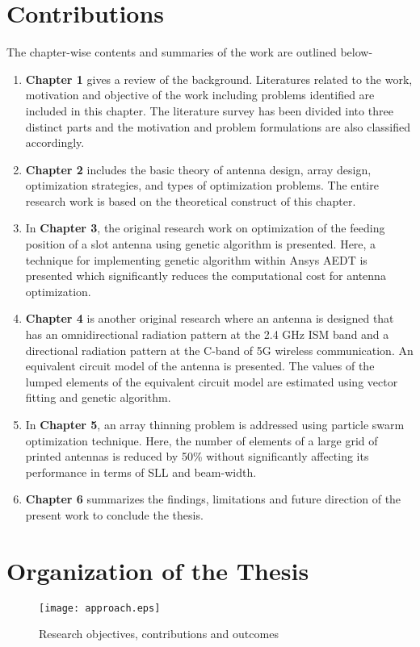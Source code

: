 \section{Contributions} \label{c1sec_contrib}
The chapter-wise contents and summaries of the work are outlined below-
\begin{enumerate}
\item \textbf{Chapter 1} gives a review of the background. Literatures related to the work, motivation and objective of the work including problems identified are included in this chapter. The literature survey has been divided into three distinct parts and the motivation and problem formulations are also classified accordingly.
\item \textbf{Chapter 2} includes the basic theory of antenna design, array design, optimization strategies, and types of optimization problems. The entire research work is based on the theoretical construct of this chapter.
\item In \textbf{Chapter 3}, the original research work on optimization of the feeding position of a slot antenna using genetic algorithm is presented. Here, a technique for implementing genetic algorithm within Ansys AEDT is presented which significantly reduces the computational cost for antenna optimization.
\item \textbf{Chapter 4} is another original research where an antenna is designed that has an omnidirectional radiation pattern at the 2.4 GHz ISM band and a directional radiation pattern at the C-band of 5G wireless communication. An equivalent circuit model of the antenna is presented. The values of the lumped elements of the equivalent circuit model are estimated using vector fitting and genetic algorithm.
\item In \textbf{Chapter 5}, an array thinning problem is addressed using particle swarm optimization technique. Here, the number of elements of a large grid of printed antennas is reduced by 50\% without significantly affecting its performance in terms of SLL and beam-width.
\item \textbf{Chapter 6} summarizes the findings, limitations and future direction of the present work to conclude the thesis.
\end{enumerate}
\section{Organization of the Thesis} \label{c1sec_organiz}

\begin{figure}
  \centering
  \texttt{[image: approach.eps]}\\
  \caption{Research objectives, contributions and outcomes} \label{fig_1_2}
\end{figure}


